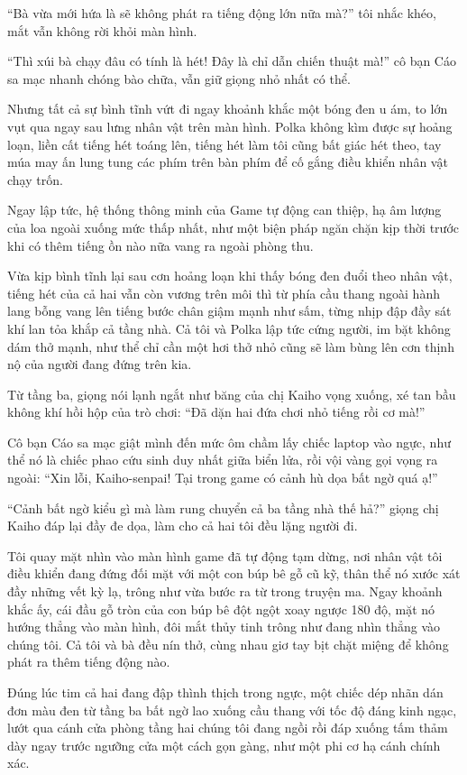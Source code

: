 \documentclass[../main.tex]{subfiles}
\begin{document}
``Bà vừa mới hứa là sẽ không phát ra tiếng động lớn nữa mà?'' tôi nhắc khéo, mắt vẫn không rời khỏi màn hình.

``Thì xúi bà chạy đâu có tính là hét! Đây là chỉ dẫn chiến thuật mà!'' cô bạn Cáo sa mạc nhanh chóng bào chữa, vẫn giữ giọng nhỏ nhất có thể.

Nhưng tất cả sự bình tĩnh vứt đi ngay khoảnh khắc một bóng đen u ám, to lớn vụt qua ngay sau lưng nhân vật trên màn hình. Polka không kìm được sự hoảng loạn, liền cất tiếng hét toáng lên, tiếng hét làm tôi cũng bất giác hét theo, tay múa may ấn lung tung các phím trên bàn phím để cố gắng điều khiển nhân vật chạy trốn.

Ngay lập tức, hệ thống thông minh của Game tự động can thiệp, hạ âm lượng của loa ngoài xuống mức thấp nhất, như một biện pháp ngăn chặn kịp thời trước khi có thêm tiếng ồn nào nữa vang ra ngoài phòng thu.

Vừa kịp bình tĩnh lại sau cơn hoảng loạn khi thấy bóng đen đuổi theo nhân vật, tiếng hét của cả hai vẫn còn vương trên môi thì từ phía cầu thang ngoài hành lang bỗng vang lên tiếng bước chân giậm mạnh như sấm, từng nhịp đập đầy sát khí lan tỏa khắp cả tầng nhà.  Cả tôi và Polka lập tức cứng người, im bặt không dám thở mạnh, như thể chỉ cần một hơi thở nhỏ cũng sẽ làm bùng lên cơn thịnh nộ của người đang đứng trên kia.

Từ tầng ba, giọng nói lạnh ngắt như băng của chị Kaiho vọng xuống, xé tan bầu không khí hồi hộp của trò chơi: ``Đã dặn hai đứa chơi nhỏ tiếng rồi cơ mà!''

Cô bạn Cáo sa mạc giật mình đến mức ôm chầm lấy chiếc laptop vào ngực, như thể nó là chiếc phao cứu sinh duy nhất giữa biển lửa, rồi vội vàng gọi vọng ra ngoài: ``Xin lỗi, Kaiho-senpai! Tại trong game có cảnh hù dọa bất ngờ quá ạ!''

``Cảnh bất ngờ kiểu gì mà làm rung chuyển cả ba tầng nhà thế hả?'' giọng chị Kaiho đáp lại đầy đe dọa, làm cho cả hai tôi đều lặng người đi.

Tôi quay mặt nhìn vào màn hình game đã tự động tạm dừng, nơi nhân vật tôi điều khiển đang đứng đối mặt với một con búp bê gỗ cũ kỹ, thân thể nó xước xát đầy những vết kỳ lạ, trông như vừa bước ra từ trong truyện ma. Ngay khoảnh khắc ấy, cái đầu gỗ tròn của con búp bê đột ngột xoay ngược 180 độ, mặt nó hướng thẳng vào màn hình, đôi mắt thủy tinh trông như đang nhìn thẳng vào chúng tôi. Cả tôi và bà đều nín thở, cùng nhau giơ tay bịt chặt miệng để không phát ra thêm tiếng động nào.

Đúng lúc tim cả hai đang đập thình thịch trong ngực, một chiếc dép nhãn dán đơn màu đen từ tầng ba bất ngờ lao xuống cầu thang với tốc độ đáng kinh ngạc, lướt qua cánh cửa phòng tầng hai chúng tôi đang ngồi rồi đáp xuống tấm thảm dày ngay trước ngưỡng cửa một cách gọn gàng, như một phi cơ hạ cánh chính xác.
\end{document}
